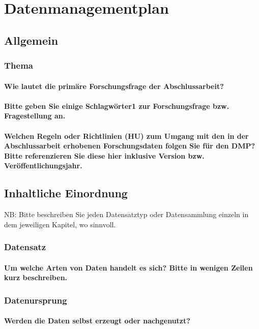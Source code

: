 \chapter{Datenmanagementplan}\label{appendix:dmp}
\section{Allgemein}
\subsection*{Thema}
\subsubsection*{Wie lautet die primäre Forschungsfrage der Abschlussarbeit?}
\subsubsection*{Bitte geben Sie einige Schlagwörter1 zur Forschungsfrage bzw. Fragestellung an.}
\subsubsection*{Welchen Regeln oder Richtlinien (HU) zum Umgang mit den in der Abschlussarbeit erhobenen Forschungsdaten folgen Sie für den DMP? Bitte referenzieren Sie diese hier inklusive Version bzw. Veröffentlichungsjahr.}

\section{Inhaltliche Einordnung}
NB: Bitte beschreiben Sie jeden Datensatztyp oder Datensammlung einzeln in dem jeweiligen Kapitel, wo sinnvoll.
\subsection*{Datensatz}
\subsubsection*{Um welche Arten von Daten handelt es sich? Bitte in wenigen Zeilen kurz beschreiben.}
\subsection*{Datenursprung}
\subsubsection*{Werden die Daten selbst erzeugt oder nachgenutzt?}
